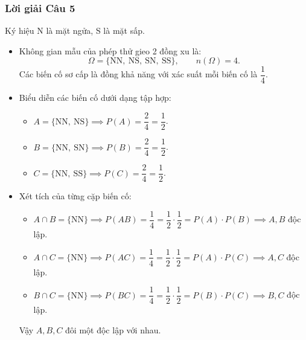 \subsubsection*{Lời giải Câu 5}
Ký hiệu N là mặt ngửa, S là mặt sấp.
\begin{itemize}
    \item Không gian mẫu của phép thử gieo 2 đồng xu là:
    \[
    \Omega = \{\text{NN},\ \text{NS},\ \text{SN},\ \text{SS}\}, \qquad n(\Omega) = 4.
    \]
    Các biến cố sơ cấp là đồng khả năng với xác suất mỗi biến cố là $\dfrac{1}{4}$.
    \item Biểu diễn các biến cố dưới dạng tập hợp:
    \begin{itemize}
        \item $A = \{\text{NN},\ \text{NS}\} \implies P(A) = \dfrac{2}{4} = \dfrac{1}{2}$.
        \item $B = \{\text{NN},\ \text{SN}\} \implies P(B) = \dfrac{2}{4} = \dfrac{1}{2}$.
        \item $C = \{\text{NN},\ \text{SS}\} \implies P(C) = \dfrac{2}{4} = \dfrac{1}{2}$.
    \end{itemize}
    \item Xét tích của từng cặp biến cố:
    \begin{itemize}
        \item $A \cap B = \{\text{NN}\} \implies P(AB) = \dfrac{1}{4} = \dfrac{1}{2} \cdot \dfrac{1}{2} = P(A) \cdot P(B) \implies A, B$ độc lập.
        \item $A \cap C = \{\text{NN}\} \implies P(AC) = \dfrac{1}{4} = \dfrac{1}{2} \cdot \dfrac{1}{2} = P(A) \cdot P(C) \implies A, C$ độc lập.
        \item $B \cap C = \{\text{NN}\} \implies P(BC) = \dfrac{1}{4} = \dfrac{1}{2} \cdot \dfrac{1}{2} = P(B) \cdot P(C) \implies B, C$ độc lập.
    \end{itemize}
    Vậy $A, B, C$ đôi một độc lập với nhau.
\end{itemize}

